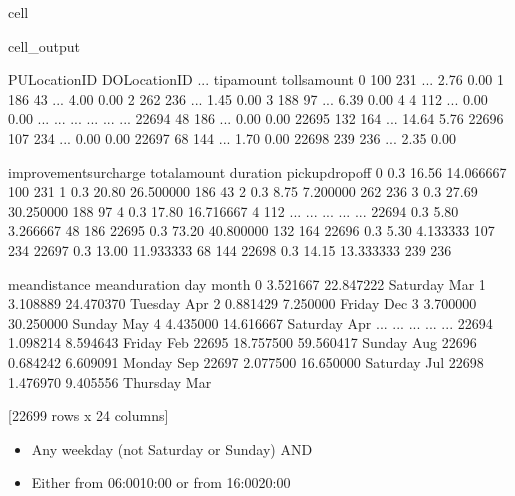 \documentclass[letterpaper,10pt,english]{sphinxmanual}
\begin{document}
\begin{sphinxuseclass}{cell}
\begin{sphinxuseclass}{cell_output}
\begin{sphinxVerbatim}[commandchars=\\\{\}]
       PULocationID  DOLocationID  ...  tip\PYGZus{}amount  tolls\PYGZus{}amount  \PYGZbs{}
0               100           231  ...        2.76          0.00   
1               186            43  ...        4.00          0.00   
2               262           236  ...        1.45          0.00   
3               188            97  ...        6.39          0.00   
4                 4           112  ...        0.00          0.00   
...             ...           ...  ...         ...           ...   
22694            48           186  ...        0.00          0.00   
22695           132           164  ...       14.64          5.76   
22696           107           234  ...        0.00          0.00   
22697            68           144  ...        1.70          0.00   
22698           239           236  ...        2.35          0.00   

       improvement\PYGZus{}surcharge  total\PYGZus{}amount   duration  pickup\PYGZus{}dropoff  \PYGZbs{}
0                        0.3         16.56  14.066667         100 231   
1                        0.3         20.80  26.500000          186 43   
2                        0.3          8.75   7.200000         262 236   
3                        0.3         27.69  30.250000          188 97   
4                        0.3         17.80  16.716667           4 112   
...                      ...           ...        ...             ...   
22694                    0.3          5.80   3.266667          48 186   
22695                    0.3         73.20  40.800000         132 164   
22696                    0.3          5.30   4.133333         107 234   
22697                    0.3         13.00  11.933333          68 144   
22698                    0.3         14.15  13.333333         239 236   

       mean\PYGZus{}distance  mean\PYGZus{}duration       day month  
0           3.521667      22.847222  Saturday   Mar  
1           3.108889      24.470370   Tuesday   Apr  
2           0.881429       7.250000    Friday   Dec  
3           3.700000      30.250000    Sunday   May  
4           4.435000      14.616667  Saturday   Apr  
...              ...            ...       ...   ...  
22694       1.098214       8.594643    Friday   Feb  
22695      18.757500      59.560417    Sunday   Aug  
22696       0.684242       6.609091    Monday   Sep  
22697       2.077500      16.650000  Saturday   Jul  
22698       1.476970       9.405556  Thursday   Mar  

[22699 rows x 24 columns]
\end{sphinxVerbatim}

\end{sphinxuseclass}
\end{sphinxuseclass}\begin{itemize}
\item {} 
\sphinxAtStartPar
Any weekday (not Saturday or Sunday) AND

\item {} 
\sphinxAtStartPar
Either from 06:00\textendash{}10:00 or from 16:00\textendash{}20:00

\end{itemize}
\end{document}
